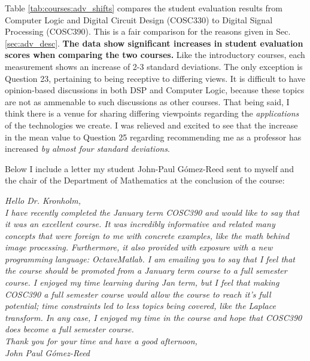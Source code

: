 \documentclass[../../main.tex]{subfiles}
\begin{document}
Table \ref{tab:courses:adv_shifts} compares the student evaluation results from Computer Logic and Digital Circuit Design (COSC330) to Digital Signal Processing (COSC390).  This is a fair comparison for the reasons given in Sec. \ref{sec:adv_desc}.  \textbf{The data show significant increases in student evaluation scores when comparing the two courses.}  Like the introductory courses, each measurement shows an increase of 2-3 standard deviations.  The only exception is Question 23, pertaining to being receptive to differing views.  It is difficult to have opinion-based discussions in both DSP and Computer Logic, because these topics are not as ammenable to such discussions as other courses.  That being said, I think there is a venue for sharing differing viewpoints regarding the \textit{applications} of the technologies we create.  I was relieved and excited to see that the increase in the mean value to Question 25 regarding recommending me as a professor has increased \textit{by almost four standard deviations}. \\ \hspace{0.1cm}

Below I include a letter my student John-Paul G\'{o}mez-Reed sent to myself and the chair of the Department of Mathematics at the conclusion of the course: \\ \hspace{0.1cm}

\textit{Hello Dr. Kronholm, \\ \vspace{0.5cm} I have recently completed the January term COSC390 and would like to say that it was an excellent course. It was incredibly informative and related many concepts that were foreign to me with concrete examples, like the math behind image processing.  Furthermore, it also provided with exposure with a new programming language: Octave\/Matlab.  I am emailing you to say that I feel that the course should be promoted from a January term course to a full semester course.  I enjoyed my time learning during Jan term, but I feel that making COSC390 a full semester course would allow the course to reach it's full potential; time constraints led to less topics being covered, like the Laplace transform.  In any case, I enjoyed my time in the course and hope that COSC390 does become a full semester course. \\ \vspace{0.5cm} Thank you for your time and have a good afternoon, \\ John Paul G\'omez-Reed}
\end{document}
